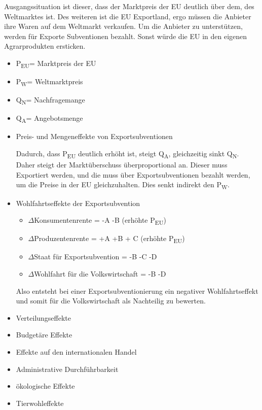\documentclass[11pt]{scrbook}
\begin{document}
Ausgangssituation ist dieser, dass der Marktpreis der \ac{EU} deutlich über dem, des Weltmarktes ist.
Des weiteren ist die \ac{EU} Exportland, ergo müssen die Anbieter ihre Waren auf dem Weltmarkt verkaufen.
Um die Anbieter zu unterstützen, werden für Exporte Subventionen bezahlt.
Sonst würde die \ac{EU} in den eigenen Agrarprodukten ersticken.


\begin{itemize}
	\item P\textsubscript{EU}= Marktpreis der \ac{EU}
	\item P\textsubscript{W}= Weltmarktpreis
	\item Q\textsubscript{N}= Nachfragemange
	\item Q\textsubscript{A}= Angebotsmenge
\end{itemize}


\begin{itemize}
	\item Preis- und Mengeneffekte von Exportsubventionen

		Dadurch, dass P\textsubscript{EU} deutlich erhöht ist, steigt Q\textsubscript{A}, gleichzeitig sinkt Q\textsubscript{N}.
		Daher steigt der Marktüberschuss überproportional an.
		Dieser muss Exportiert werden, und die muss über Exportsubventionen bezahlt werden, um die Preise in der \ac{EU} gleichzuhalten.
		Dies senkt indirekt den P\textsubscript{W}.

	\item Wohlfahrtseffekte der Exportsubvention
	
\begin{itemize}
	\item $\Delta$Konsumentenrente = -A -B (erhöhte P\textsubscript{EU})
	\item $\Delta$Produzentenrente = +A +B + C (erhöhte P\textsubscript{EU})
	\item $\Delta$Staat für Exportsubvention = -B -C -D
	\item $\Delta$Wohlfahrt für die Volkswirtschaft = -B -D
		

\end{itemize}
		Also entsteht bei einer Exportsubventionierung ein negativer Wohlfahrtseffekt und somit für die Volkswirtschaft als Nachteilig zu bewerten.

	\item Verteilungseffekte
	\item Budgetäre Effekte
	\item Effekte auf den internationalen Handel
	\item Administrative Durchführbarkeit
	\item ökologische Effekte
	\item Tierwohleffekte
\end{itemize}
\end{document}
